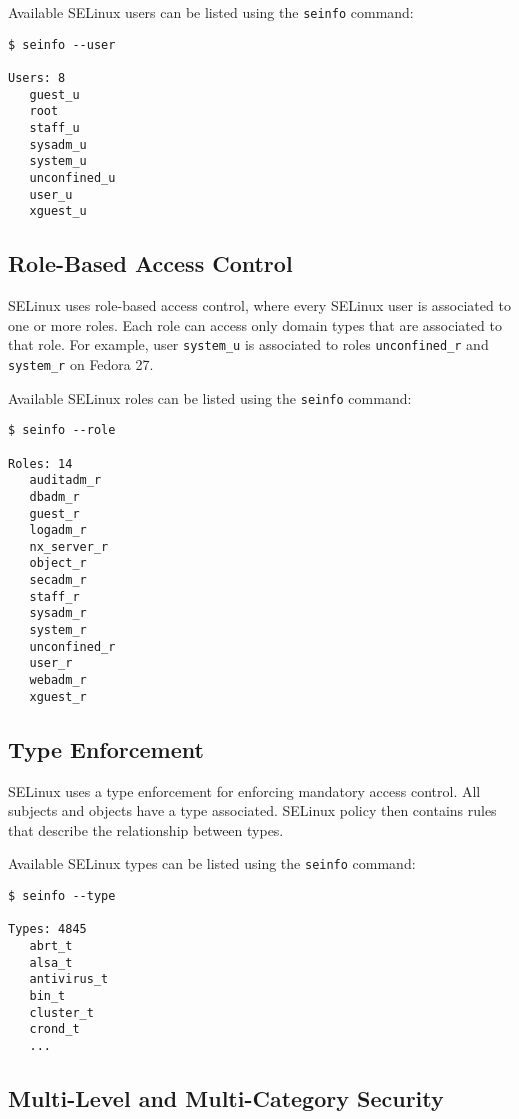 Available SELinux users can be listed using the \texttt{seinfo} command:
\begin{lstlisting}
$ seinfo --user

Users: 8
   guest_u
   root
   staff_u
   sysadm_u
   system_u
   unconfined_u
   user_u
   xguest_u
\end{lstlisting}

\subsection{Role-Based Access Control}
\label{rbac}
SELinux uses role-based access control, where every SELinux user is associated
to one or more roles. Each role can access only domain types that are associated
to that role. For example, user \texttt{system\_u} is associated to roles
\texttt{unconfined\_r} and \texttt{system\_r} on Fedora 27.

Available SELinux roles can be listed using the \texttt{seinfo} command:
\begin{lstlisting}
$ seinfo --role

Roles: 14
   auditadm_r
   dbadm_r
   guest_r
   logadm_r
   nx_server_r
   object_r
   secadm_r
   staff_r
   sysadm_r
   system_r
   unconfined_r
   user_r
   webadm_r
   xguest_r
\end{lstlisting}

\subsection{Type Enforcement}
\label{te}
SELinux uses a type enforcement for enforcing mandatory access control. All
subjects and objects have a type associated. SELinux policy then contains rules
that describe the relationship between types.

Available SELinux types can be listed using the \texttt{seinfo} command:
\begin{lstlisting}
$ seinfo --type

Types: 4845
   abrt_t
   alsa_t
   antivirus_t
   bin_t
   cluster_t
   crond_t
   ...
\end{lstlisting}

\subsection{Multi-Level and Multi-Category Security}
\label{mls}


